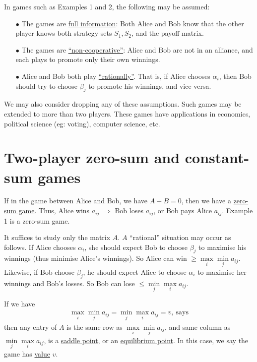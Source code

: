 In games such as Examples 1 and 2, the following may be assumed:
\begin{itemize}
    \item[$\bullet$] The games are \uline{full information}: Both Alice and Bob know that the other player knows both strategy sets $S_1, S_2$, and the payoff matrix.
    \item[$\bullet$] The games are \uline{``non-cooperative''}: Alice and Bob are not in an alliance, and each plays to promote only their own winnings.
    \item[$\bullet$] Alice and Bob both play \uline{``rationally''}. That is, if Alice chooses $\alpha_i$, then Bob should try to choose $\beta_j$ to promote his winnings, and vice versa.
\end{itemize}

We may also consider dropping any of these assumptions. Such games may be extended to more than two players. These games have applications in economics, political science (eg: voting), computer science, etc.

\section{Two-player zero-sum and constant-sum games}\label{section 2.2}
If in the game between Alice and Bob, we have $A+B=0$, then we have a \uline{zero-sum game}. Thus, Alice wins $a_{ij}$ $\Longrightarrow$ Bob loses $a_{ij}$, or Bob pays Alice $a_{ij}$. Example 1 is a zero-sum game.

It suffices to study only the matrix $A$. $A$ ``rational'' situation may occur as follows. If Alice chooses $\alpha_i$, she should expect Bob to choose $\beta_j$ to maximise his winnings (thus minimise Alice's winnings). So Alice can win $\geqslant \max\limits_{i}\min\limits_{j}a_{ij}$. Likewise, if Bob choose $\beta_j$, he should expect Alice to choose $\alpha_i$ to maximise her winnings and Bob's losses. So Bob can lose $\leqslant \min\limits_{j}\max\limits_{i} a_{ij}$.

If we have 
\begin{align}
    \max\limits_i \min\limits_j a_{ij} = \min\limits_j \max\limits_i a_{ij} = v,\ \text{says} \nonumber
\end{align}
then any entry of $A$ is the same row as $\max\limits_i \min\limits_j a_{ij}$, and same column as $\min\limits_j\max\limits_i a_{ij}$, is a \uline{saddle point}, or an \uline{equilibrium point}. In this case, we say the game has \uline{value} $v$.

